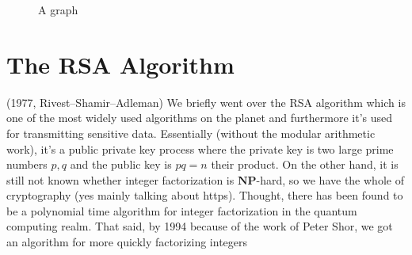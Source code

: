 \documentclass[12pt]{amsart}
\theoremstyle{definition}
\theoremstyle{question}
\begin{document}
\begin{onehalfspace}
        \begin{figure}
            \centering
            \caption{A graph}
            \label{figureIndepSet}
        \end{figure}

        \section{The RSA Algorithm} (1977, Rivest–Shamir–Adleman)
        We briefly went over the RSA algorithm which is one of the most widely used algorithms on the planet and
        furthermore it's used for transmitting sensitive data.
        Essentially (without the modular arithmetic work), it's a public private key process where
        the private key is two large prime numbers $p,q$ and the public key is $pq=n$ their product.
        On the other hand, it is still not known whether integer factorization is $\mathbf{NP}$-hard, so we have the whole of
        cryptography (yes mainly talking about https).
        Thought, there has been found to be a polynomial time algorithm for integer factorization in the quantum
        computing realm.
        That said, by 1994 because of the work of Peter Shor, we got an algorithm for more quickly factorizing integers


\end{onehalfspace}
\end{document}
